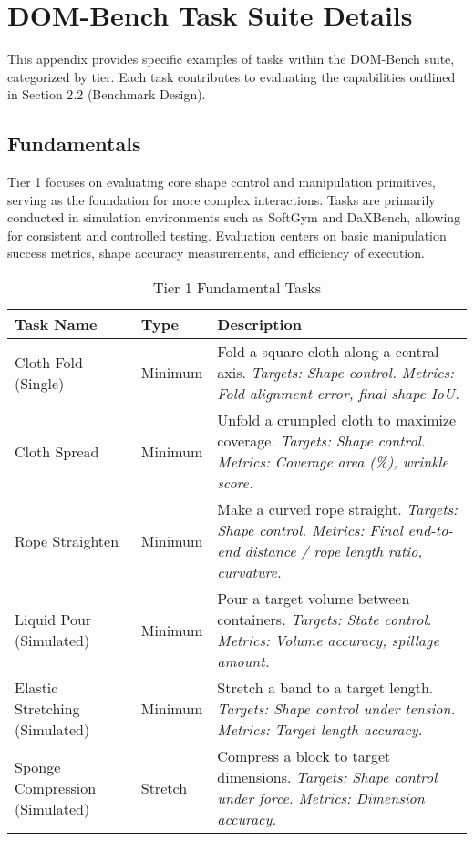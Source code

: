 \section{DOM-Bench Task Suite Details}
\label{app:task_suite} %

This appendix provides specific examples of tasks within the DOM-Bench suite, categorized by tier. Each task contributes to evaluating the capabilities outlined in Section 2.2 (Benchmark Design).

\subsection{Fundamentals}

Tier 1 focuses on evaluating core shape control and manipulation primitives, serving as the foundation for more complex interactions. Tasks are primarily conducted in simulation environments such as SoftGym and DaXBench, allowing for consistent and controlled testing. Evaluation centers on basic manipulation success metrics, shape accuracy measurements, and efficiency of execution.

\begin{table}[h]
\centering
\begin{tabular}{|p{3.5cm}|p{2cm}|p{8.5cm}|}
\hline
\textbf{Task Name} & \textbf{Type} & \textbf{Description} \\
\hline
Cloth Fold (Single) & Minimum & Fold a square cloth along a central axis. \textit{Targets: Shape control. Metrics: Fold alignment error, final shape IoU.} \\
\hline
Cloth Spread & Minimum & Unfold a crumpled cloth to maximize coverage. \textit{Targets: Shape control. Metrics: Coverage area (\%), wrinkle score.} \\
\hline
Rope Straighten & Minimum & Make a curved rope straight. \textit{Targets: Shape control. Metrics: Final end-to-end distance / rope length ratio, curvature.} \\
\hline
Liquid Pour (Simulated) & Minimum & Pour a target volume between containers. \textit{Targets: State control. Metrics: Volume accuracy, spillage amount.} \\
\hline
Elastic Stretching (Simulated) & Minimum & Stretch a band to a target length. \textit{Targets: Shape control under tension. Metrics: Target length accuracy.} \\
\hline
Sponge Compression (Simulated) & Stretch & Compress a block to target dimensions. \textit{Targets: Shape control under force. Metrics: Dimension accuracy.} \\
\hline
\end{tabular}
\caption{Tier 1 Fundamental Tasks}
\end{table}

